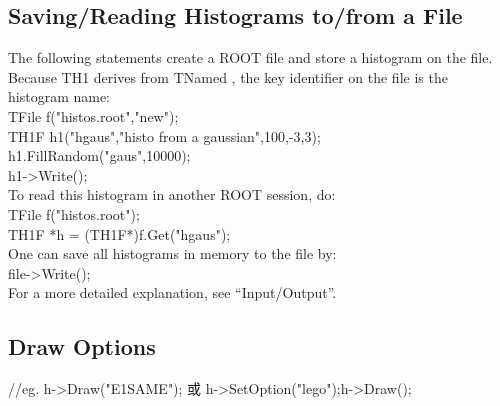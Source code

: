 \documentclass[11pt,a4paper,titlepage]{article}
\begin{document}
{\subsection{Saving/Reading Histograms to/from a File}
The following statements create a ROOT file and store a histogram on the file. Because TH1 derives from TNamed , the key identifier on the file is the histogram name:\\
TFile f("histos.root","new");\\
TH1F h1("hgaus","histo from a gaussian",100,-3,3);\\
h1.FillRandom("gaus",10000);\\
h1->Write();\\
To read this histogram in another ROOT session, do:\\
TFile f("histos.root");\\
TH1F *h = (TH1F*)f.Get("hgaus");\\
One can save all histograms in memory to the file by:\\
file->Write();\\
For a more detailed explanation, see “Input/Output”.\\

\subsection{Draw Options} %
//eg. h->Draw("E1SAME"); 或 h->SetOption("lego");h->Draw();\\
\\
}
\end{document}
